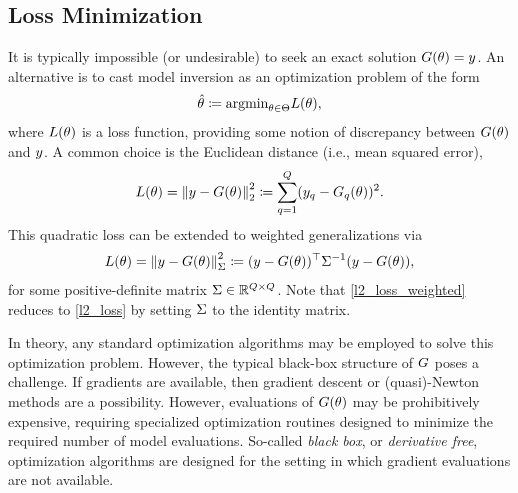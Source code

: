 \documentclass[12pt]{article}
\begin{document}
\subsection{Loss Minimization}
It is typically impossible (or undesirable) to seek an exact solution $G(\theta) = y$. An alternative is to cast 
model inversion as an optimization problem of the form 
\begin{align}
\hat{\theta} \coloneqq \text{argmin}_{\theta \in \Theta} L(\theta), \label{opt}
\end{align}
where $L(\theta)$ is a loss function, providing some notion of discrepancy between $G(\theta)$ and $y$.
A common choice is the Euclidean distance (i.e., mean squared error),
\begin{align}
L(\theta) = \left\lVert y - G(\theta)\right\rVert^2_2 \coloneqq \sum_{q=1}^{Q} (y_{q} - G_{q}(\theta))^2. \label{l2_loss}
\end{align}
This quadratic loss can be extended to weighted generalizations via 
\begin{align}
L(\theta) = \left\lVert y - G(\theta)\right\rVert^2_{\Sigma} \coloneqq (y - G(\theta))^\top \Sigma^{-1} (y - G(\theta)), \label{l2_loss_weighted}
\end{align}
for some positive-definite matrix $\Sigma \in \mathbb{R}^{Q \times Q}$. Note that \ref{l2_loss_weighted} reduces to 
\ref{l2_loss} by setting $\Sigma$ to the identity matrix. 

In theory, any standard optimization algorithms may be employed to solve this optimization problem. However, 
the typical black-box structure of $G$ poses a challenge. If gradients are available, then gradient descent or 
(quasi)-Newton methods are a possibility. However, evaluations of $G(\theta)$ may be prohibitively expensive, 
requiring specialized optimization routines designed to minimize the required number of model evaluations. 
So-called \textit{black box}, or \textit{derivative free}, optimization algorithms are designed for the setting 
in which gradient evaluations are not available. 
\end{document}
